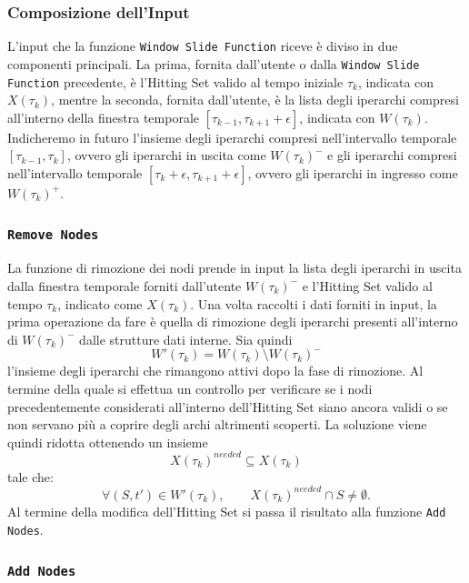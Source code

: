 \subsubsection*{Composizione dell'Input}

L'input che la funzione \texttt{Window Slide Function} riceve è diviso in due componenti principali.
La prima, fornita dall'utente o dalla \texttt{Window Slide Function} precedente, è l'Hitting Set valido al tempo iniziale $\tau_k$, indicata con $X(\tau_k)$, mentre la seconda, fornita dall'utente, è la lista degli iperarchi compresi all'interno della finestra temporale $[\tau_{k-1}, \tau_{k+1}+\epsilon]$, indicata con $W(\tau_k)$.
Indicheremo in futuro l'insieme degli iperarchi compresi nell'intervallo temporale $[\tau_{k-1}, \tau_{k}]$, ovvero gli iperarchi in uscita come $W{(\tau_k)}^{-}$ e gli iperarchi compresi nell'intervallo temporale $[\tau_{k}+\epsilon, \tau_{k+1}+\epsilon]$, ovvero gli iperarchi in ingresso come $W{(\tau_k)}^{+}$.


\subsubsection*{\texttt{Remove Nodes}}

La funzione di rimozione dei nodi prende in input la lista degli iperarchi in uscita dalla finestra temporale forniti dall'utente $W{(\tau_k)}^{-}$ e l'Hitting Set valido al tempo $\tau_k$, indicato come $X(\tau_k)$.
Una volta raccolti i dati forniti in input, la prima operazione da fare è quella di rimozione degli iperarchi presenti all'interno di $W{(\tau_k)}^{-}$ dalle strutture dati interne.
Sia quindi
\[
W'(\tau_k) = W{(\tau_k)} \setminus W{(\tau_k)}^{-}
\]
l'insieme degli iperarchi che rimangono attivi dopo la fase di rimozione.
Al termine della quale si effettua un controllo per verificare se i nodi precedentemente considerati all'interno dell'Hitting Set siano ancora validi o se non servano più a coprire degli archi altrimenti scoperti.
La soluzione viene quindi ridotta ottenendo un insieme
\[
X{(\tau_k)}^{needed}\subseteq X(\tau_k)
\]
tale che:
\[
\forall (S,t')\in W'(\tau_k),\qquad X{(\tau_k)}^{needed}\cap S\neq\emptyset.
\]
Al termine della modifica dell'Hitting Set si passa il risultato alla funzione \texttt{Add Nodes}.

\subsubsection*{\texttt{Add Nodes}}


